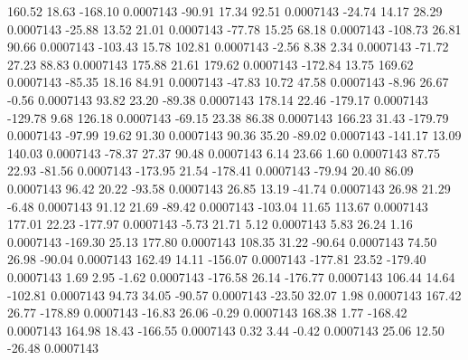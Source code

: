       160.52       18.63     -168.10     0.0007143
      -90.91       17.34       92.51     0.0007143
      -24.74       14.17       28.29     0.0007143
      -25.88       13.52       21.01     0.0007143
      -77.78       15.25       68.18     0.0007143
     -108.73       26.81       90.66     0.0007143
     -103.43       15.78      102.81     0.0007143
       -2.56        8.38        2.34     0.0007143
      -71.72       27.23       88.83     0.0007143
      175.88       21.61      179.62     0.0007143
     -172.84       13.75      169.62     0.0007143
      -85.35       18.16       84.91     0.0007143
      -47.83       10.72       47.58     0.0007143
       -8.96       26.67       -0.56     0.0007143
       93.82       23.20      -89.38     0.0007143
      178.14       22.46     -179.17     0.0007143
     -129.78        9.68      126.18     0.0007143
      -69.15       23.38       86.38     0.0007143
      166.23       31.43     -179.79     0.0007143
      -97.99       19.62       91.30     0.0007143
       90.36       35.20      -89.02     0.0007143
     -141.17       13.09      140.03     0.0007143
      -78.37       27.37       90.48     0.0007143
        6.14       23.66        1.60     0.0007143
       87.75       22.93      -81.56     0.0007143
     -173.95       21.54     -178.41     0.0007143
      -79.94       20.40       86.09     0.0007143
       96.42       20.22      -93.58     0.0007143
       26.85       13.19      -41.74     0.0007143
       26.98       21.29       -6.48     0.0007143
       91.12       21.69      -89.42     0.0007143
     -103.04       11.65      113.67     0.0007143
      177.01       22.23     -177.97     0.0007143
       -5.73       21.71        5.12     0.0007143
        5.83       26.24        1.16     0.0007143
     -169.30       25.13      177.80     0.0007143
      108.35       31.22      -90.64     0.0007143
       74.50       26.98      -90.04     0.0007143
      162.49       14.11     -156.07     0.0007143
     -177.81       23.52     -179.40     0.0007143
        1.69        2.95       -1.62     0.0007143
     -176.58       26.14     -176.77     0.0007143
      106.44       14.64     -102.81     0.0007143
       94.73       34.05      -90.57     0.0007143
      -23.50       32.07        1.98     0.0007143
      167.42       26.77     -178.89     0.0007143
      -16.83       26.06       -0.29     0.0007143
      168.38        1.77     -168.42     0.0007143
      164.98       18.43     -166.55     0.0007143
        0.32        3.44       -0.42     0.0007143
       25.06       12.50      -26.48     0.0007143
